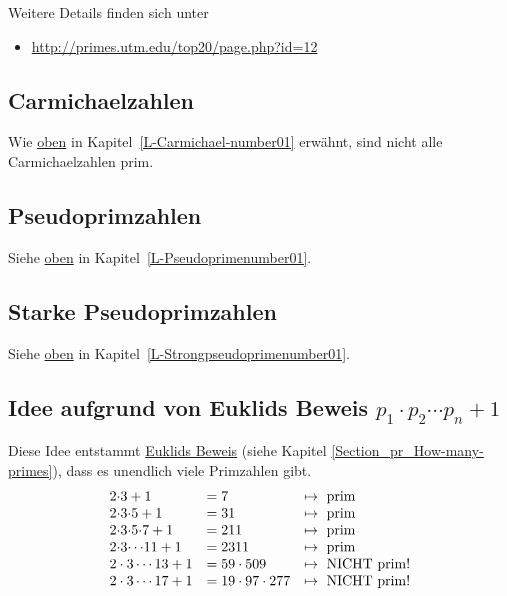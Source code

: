 \begin{refsegment}
    Weitere Details finden sich unter
    \vspace{-10pt}
    \begin{itemize}
      \item[] \url{http://primes.utm.edu/top20/page.php?id=12}
    \end{itemize}




\subsection{Carmichaelzahlen}
Wie \hyperlink{HT-Carmichael-number01}{oben} in
Kapitel~\ref{L-Carmichael-number01} erwähnt,
sind nicht alle Carmichaelzahlen prim.


\subsection{Pseudoprimzahlen}
Siehe \hyperlink{HT-Pseudoprimenumber01}{oben} in
Kapitel~\ref{L-Pseudoprimenumber01}.


\subsection{Starke Pseudoprimzahlen}
 
Siehe \hyperlink{HT-Strongpseudoprimenumber01}{oben} in
Kapitel~\ref{L-Strongpseudoprimenumber01}.



\subsection
    [Idee aufgrund von Euklids Beweis \texorpdfstring{$p_1 \cdot p_2 \cdots p_n +1$}{p\_1 ... p\_2 ... p\_n +1}]
    {Idee aufgrund von Euklids Beweis $p_1 \cdot p_2 \cdots p_n +1$}
Diese Idee entstammt \hyperlink{ht_euclid}{Euklids Beweis} %
(siehe Kapitel \ref{Section_pr_How-many-primes}),
dass es unendlich viele Primzahlen gibt.
$$
\begin{array}{lll}
2{\cdot}3 +1 &      = 7 &          \mapsto {\rm ~prim} \\
2{\cdot}3{\cdot}5 +1 &      = 31    &      \mapsto {\rm ~prim} \\
2{\cdot}3{\cdot}5{\cdot}7 +1 &      = 211   &      \mapsto {\rm ~prim} \\
2{\cdot}3{\cdots}11 +1 &        = 2311  &      \mapsto {\rm ~prim} \\
2\cdot3 \cdots 13 +1 &  = 59 \cdot 509 &    \mapsto {\rm ~NICHT~prim} ! \\
2\cdot3 \cdots 17 +1 &  = 19 \cdot 97 \cdot 277 &   \mapsto {\rm ~NICHT~prim} ! \\
\end{array}
$$



\end{refsegment}
